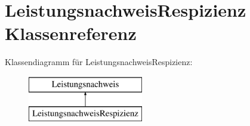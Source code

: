 \hypertarget{class_leistungsnachweis_respizienz}{}\section{Leistungsnachweis\+Respizienz Klassenreferenz}
\label{class_leistungsnachweis_respizienz}
Klassendiagramm für Leistungsnachweis\+Respizienz\+:\begin{figure}[H]
\begin{center}
\leavevmode
\includegraphics[height=2.000000cm]{class_leistungsnachweis_respizienz}
\end{center}
\end{figure}
